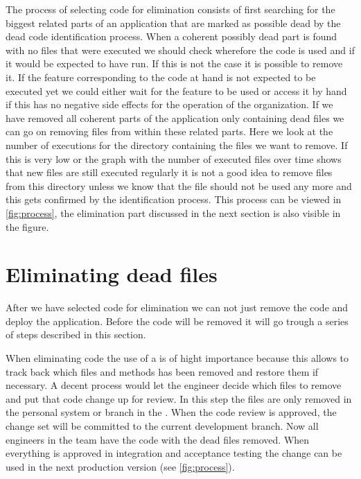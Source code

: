 
The process of selecting code for elimination consists of first searching for the biggest related parts of an application that are marked as possible dead by the dead code identification process. When a coherent possibly dead part is found with no files that were executed we should check wherefore the code is used and if it would be expected to have run. If this is not the case it is possible to remove it. If the feature corresponding to the code at hand is not expected to be executed yet we could either wait for the feature to be used or access it by hand if this has no negative side effects for the operation of the organization. If we have removed all coherent parts of the application only containing dead files we can go on removing files from within these related parts. Here we look at the number of executions for the directory containing the files we want to remove. If this is very low or the graph with the number of executed files over time shows that new files are still executed regularly it is not a good idea to remove files from this directory unless we know that the file should not be used any more and this gets confirmed by the identification process. This process can be viewed in \autoref{fig:process}, the elimination part discussed in the next section is also visible in the figure.


\section{Eliminating dead files}
After we have selected code for elimination we can not just remove the code and deploy the application. Before the code will be removed it will go trough a series of steps described in this section. 

When eliminating code the use of a \vcs is of hight importance because this allows to track back which files and methods has been removed and restore them if necessary. A decent process would let the engineer decide which files to remove and put that code change up for review. In this step the files are only removed in the personal system or branch in the \vcs. When the code review is approved, the change set will be committed  
to the current development branch. Now all engineers in the team have the code with the dead files removed. When everything is approved in integration and acceptance testing the change can be used in the next production version (see \autoref{fig:process}).

